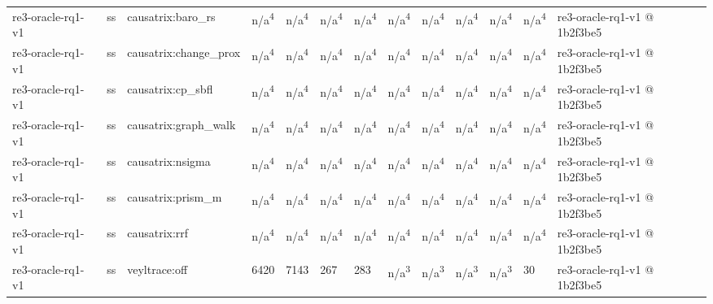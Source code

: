 \begin{table}[t]
\begin{tabular}{lllllllllllll}
re3-oracle-rq1-v1 & ss & causatrix:baro\_rs & n/a\textsuperscript{4} & n/a\textsuperscript{4} & n/a\textsuperscript{4} & n/a\textsuperscript{4} & n/a\textsuperscript{4} & n/a\textsuperscript{4} & n/a\textsuperscript{4} & n/a\textsuperscript{4} & n/a\textsuperscript{4} & re3-oracle-rq1-v1 @ 1b2f3be5 \\
re3-oracle-rq1-v1 & ss & causatrix:change\_prox & n/a\textsuperscript{4} & n/a\textsuperscript{4} & n/a\textsuperscript{4} & n/a\textsuperscript{4} & n/a\textsuperscript{4} & n/a\textsuperscript{4} & n/a\textsuperscript{4} & n/a\textsuperscript{4} & n/a\textsuperscript{4} & re3-oracle-rq1-v1 @ 1b2f3be5 \\
re3-oracle-rq1-v1 & ss & causatrix:cp\_sbfl & n/a\textsuperscript{4} & n/a\textsuperscript{4} & n/a\textsuperscript{4} & n/a\textsuperscript{4} & n/a\textsuperscript{4} & n/a\textsuperscript{4} & n/a\textsuperscript{4} & n/a\textsuperscript{4} & n/a\textsuperscript{4} & re3-oracle-rq1-v1 @ 1b2f3be5 \\
re3-oracle-rq1-v1 & ss & causatrix:graph\_walk & n/a\textsuperscript{4} & n/a\textsuperscript{4} & n/a\textsuperscript{4} & n/a\textsuperscript{4} & n/a\textsuperscript{4} & n/a\textsuperscript{4} & n/a\textsuperscript{4} & n/a\textsuperscript{4} & n/a\textsuperscript{4} & re3-oracle-rq1-v1 @ 1b2f3be5 \\
re3-oracle-rq1-v1 & ss & causatrix:nsigma & n/a\textsuperscript{4} & n/a\textsuperscript{4} & n/a\textsuperscript{4} & n/a\textsuperscript{4} & n/a\textsuperscript{4} & n/a\textsuperscript{4} & n/a\textsuperscript{4} & n/a\textsuperscript{4} & n/a\textsuperscript{4} & re3-oracle-rq1-v1 @ 1b2f3be5 \\
re3-oracle-rq1-v1 & ss & causatrix:prism\_m & n/a\textsuperscript{4} & n/a\textsuperscript{4} & n/a\textsuperscript{4} & n/a\textsuperscript{4} & n/a\textsuperscript{4} & n/a\textsuperscript{4} & n/a\textsuperscript{4} & n/a\textsuperscript{4} & n/a\textsuperscript{4} & re3-oracle-rq1-v1 @ 1b2f3be5 \\
re3-oracle-rq1-v1 & ss & causatrix:rrf & n/a\textsuperscript{4} & n/a\textsuperscript{4} & n/a\textsuperscript{4} & n/a\textsuperscript{4} & n/a\textsuperscript{4} & n/a\textsuperscript{4} & n/a\textsuperscript{4} & n/a\textsuperscript{4} & n/a\textsuperscript{4} & re3-oracle-rq1-v1 @ 1b2f3be5 \\
re3-oracle-rq1-v1 & ss & veyltrace:off & 6420 & 7143 & 267 & 283 & n/a\textsuperscript{3} & n/a\textsuperscript{3} & n/a\textsuperscript{3} & n/a\textsuperscript{3} & 30 & re3-oracle-rq1-v1 @ 1b2f3be5 \\

\end{tabular}
\end{table}
